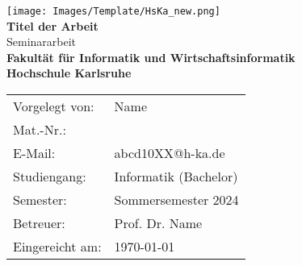 
\begin{titlepage}
	\begin{center}
		\texttt{[image: Images/Template/HsKa\_new.png]}\\[16ex]
		\huge{\textbf{Titel der Arbeit}\\Seminararbeit}\\[4ex]
		\large{\textbf{Fakultät für Informatik und Wirtschaftsinformatik}}\\[2ex]
		\large{\textbf{Hochschule Karlsruhe}}\\[22ex]
		\normalsize{}
		\begin{tabular}{ll}
			Vorgelegt von: & \quad\quad\quad Name\\[0.7ex]
			Mat.-Nr.: & \quad\quad\quad 123456 \\[0.7ex]
			E-Mail: & \quad\quad\quad abcd10XX@h-ka.de\\[0.7ex]
			Studiengang: & \quad\quad\quad Informatik (Bachelor)\\[2ex]
			Semester: & \quad\quad\quad Sommersemester 2024\\[2ex]
			Betreuer: & \quad\quad\quad Prof. Dr. Name\\[2ex]
			Eingereicht am: & \quad\quad\quad\today\\[2ex]
		\end{tabular}
	\end{center}
\end{titlepage}
